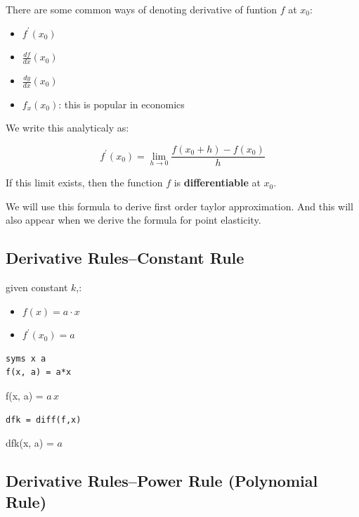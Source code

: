 \documentclass[
]{book}
\begin{document}
There are some common ways of denoting derivative of funtion \(f\) at
\(x_0\):

\begin{itemize}
\item
  \(\displaystyle f^{\prime } (x_0 )\)
\item
  \(\displaystyle \frac{df}{dx}(x_0 )\)
\item
  \(\displaystyle \frac{dy}{dx}(x_0 )\)
\item
  \(f_x (x_0 )\): this is popular in economics
\end{itemize}

We write this analyticaly as:

\[f^{\prime } (x_0 )=\lim_{h\to 0} \frac{f(x_0 +h)-f(x_0 )}{h}\]

If this limit exists, then the function \(f\) is \textbf{differentiable} at
\(x_0\).

We will use this formula to derive first order taylor approximation. And
this will also appear when we derive the formula for point elasticity.

\hypertarget{derivative-rulesconstant-rule}{%
\subsection{Derivative Rules--Constant Rule}\label{derivative-rulesconstant-rule}}

given constant \(k\),:

\begin{itemize}
\item
  \(\displaystyle f(x)=a\cdot x\)
\item
  \(\displaystyle f^{\prime } (x_0 )=a\)
\end{itemize}

\begin{verbatim}
syms x a
f(x, a) = a*x
\end{verbatim}

f(x, a) = \(\displaystyle a\,x\)

\begin{verbatim}
dfk = diff(f,x)
\end{verbatim}

dfk(x, a) = \(\displaystyle a\)

\hypertarget{derivative-rulespower-rule-polynomial-rule}{%
\subsection{Derivative Rules--Power Rule (Polynomial Rule)}\label{derivative-rulespower-rule-polynomial-rule}}
\end{document}
